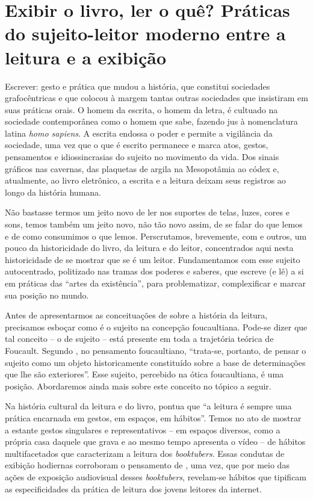 \section{Exibir o livro, ler o quê? Práticas do sujeito-leitor moderno entre a leitura e a exibição}\label{sec-exibirolivro}

Escrever: gesto e prática que mudou a história, que constitui sociedades grafocêntricas e que colocou à margem tantas outras sociedades que insistiram em suas práticas orais. O homem da escrita, o homem da letra, é cultuado na sociedade contemporânea como o homem que sabe, fazendo jus à nomenclatura latina \textit{homo sapiens}. A escrita endossa o poder e permite a vigilância da sociedade, uma vez que o que é escrito permanece e marca atos, gestos, pensamentos e idiossincrasias do sujeito no movimento da vida. Dos sinais gráficos nas cavernas, das plaquetas de argila na Mesopotâmia ao códex e, atualmente, ao livro eletrônico, a escrita e a leitura deixam seus registros ao longo da história humana.

Não bastasse termos um jeito novo de ler nos suportes de telas, luzes, cores e sons, temos também um jeito novo, não tão novo assim, de se falar do que lemos e de como consumimos o que lemos. Perscrutamos, brevemente, com \textcite{chartier1998aventura,chartier1999ordem,chartier2019lersem} e outros, um pouco da historicidade do livro, da leitura e do leitor, concentrados aqui nesta historicidade de se mostrar que se é um leitor. Fundamentamos com \textcite{foucault2009arqueologia} esse sujeito autocentrado, politizado nas tramas dos poderes e saberes, que escreve (e lê) a si em práticas das “artes da existência”, para problematizar, complexificar e marcar sua posição no mundo.

Antes de apresentarmos as conceituações de \textcite{chartier1999ordem} sobre a história da leitura, precisamos esboçar como é o sujeito na concepção foucaultiana. Pode-se dizer que tal conceito – o de sujeito – está presente em toda a trajetória teórica de Foucault. Segundo \textcite[p. 84]{revel2005}, no pensamento foucaultiano, “trata-se, portanto, de pensar o sujeito como um objeto historicamente constituído sobre a base de determinações que lhe são exteriores”. Esse sujeito, percebido na ótica foucaultiana, é uma posição. Abordaremos ainda mais sobre este conceito no tópico a seguir. 

Na história cultural da leitura e do livro, \textcite[p. 13]{chartier1999ordem} pontua que “a leitura é sempre uma prática encarnada em gestos, em espaços, em hábitos”. Temos no ato de mostrar a estante gestos singulares e representativos – em espaços diversos, como a própria casa daquele que grava e ao mesmo tempo apresenta o vídeo –  de hábitos multifacetados que caracterizam a leitura dos \textit{booktubers}. Essas condutas de exibição hodiernas corroboram o pensamento de \textcite{chartier1999ordem}, uma vez, que por meio das ações de exposição audiovisual desses \textit{booktubers}, revelam-se hábitos que tipificam as especificidades da prática de leitura dos jovens leitores da internet. 

